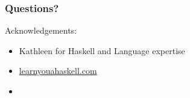 
\begin{frame} \frametitle{Questions?}
Acknowledgements:
\begin{itemize}
\item Kathleen for Haskell and Language expertise
\item \href{http://learnyouahaskell.com/}{learnyouahaskell.com}
\item
\end{itemize}
\end{frame}

